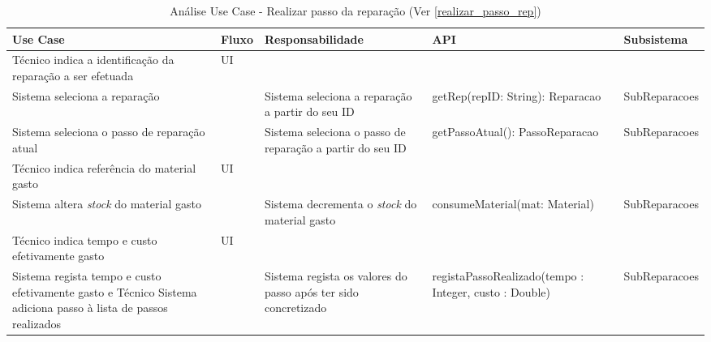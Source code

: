 \documentclass[../relatorio.tex]{subfiles}
\begin{document}
\begin{landscape}
    \begin{table}[!h]
        \centering
        \begin{tabular}{|p{5cm}|p{1cm}|p{4cm}|p{6cm}|p{3cm}|}
            \hline
            \rowcolor{gray!20!white}
            Use Case & Fluxo & Responsabilidade & API & Subsistema \\
            \hline
            \rowcolor{yellow}
            Técnico indica a identificação da reparação a ser efetuada 
                     & UI
                     &
                     &
                     &
            \\
            \hline
            Sistema seleciona a reparação
                     & 
                     & Sistema seleciona a reparação a partir do seu ID
                     & getRep(repID: String): Reparacao
                     & SubReparacoes
            \\
            \hline
            Sistema seleciona o passo de reparação atual
                    & 
                    & Sistema seleciona o passo de reparação a partir do seu ID
                    & getPassoAtual(): PassoReparacao
                    & SubReparacoes
            \\
            \hline
            \rowcolor{yellow}
            Técnico indica referência do material gasto
                     & UI
                     &
                     &
                     &        
            \\
            \hline
            \rowcolor{yellow}
            Sistema altera \textit{stock} do material gasto
                     & 
                     & Sistema decrementa o \textit{stock} do material gasto
                     & consumeMaterial(mat: Material)
                     & SubReparacoes
            \\
            \hline
            \rowcolor{yellow}
            Técnico indica tempo e custo efetivamente gasto
                     & UI
                     & 
                     &
                     & 
            \\
            \hline
            Sistema regista tempo e custo efetivamente gasto e Técnico
            Sistema adiciona passo à lista de passos realizados
                     & 
                     & Sistema regista os valores do passo após ter sido concretizado
                     & registaPassoRealizado(tempo : Integer, custo : Double)
                     & SubReparacoes
            \\
            \hline
        \end{tabular}
        \caption{Análise Use Case - Realizar passo da reparação (Ver \ref{realizar_passo_rep})}
    \end{table}
\end{landscape}
\end{document}
